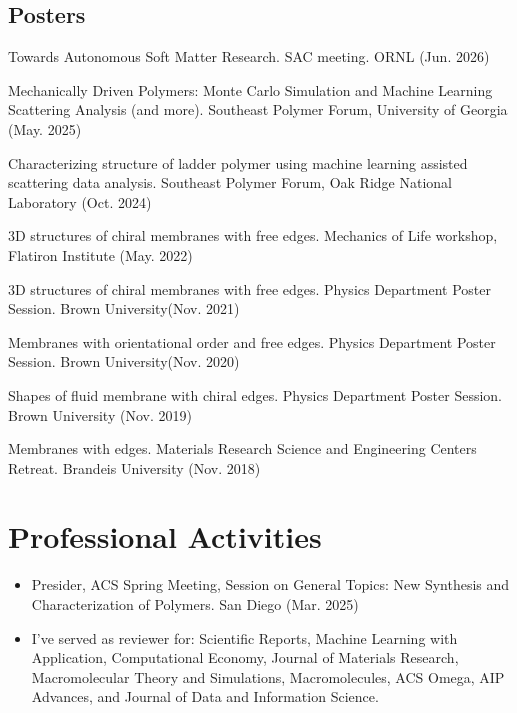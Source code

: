 \documentclass[11pt,letterpaper]{article}
\begin{document}
\subsection*{Posters}
\begin{etaremune}
    \item Towards Autonomous Soft Matter Research. SAC meeting. ORNL (Jun. 2026)
    \item Mechanically Driven Polymers: Monte Carlo Simulation and Machine Learning Scattering Analysis (and more). Southeast Polymer Forum, University of Georgia  (May. 2025)
    \item Characterizing structure of ladder polymer using machine learning assisted scattering data analysis. Southeast Polymer Forum, Oak Ridge National Laboratory (Oct. 2024)
    \item 3D structures of chiral membranes with free edges. Mechanics of Life workshop, Flatiron Institute (May. 2022)
    \item 3D structures of chiral membranes with free edges. Physics Department Poster Session. Brown University(Nov. 2021)
    \item Membranes with orientational order and free edges. Physics Department Poster Session. Brown University(Nov. 2020)
    \item Shapes of fluid membrane with chiral edges. Physics Department Poster Session. Brown University (Nov. 2019)
    \item Membranes with edges. Materials Research Science and Engineering Centers Retreat. Brandeis University (Nov. 2018)
\end{etaremune}



\section*{Professional Activities}
\vspace*{-0.15in}
\begin{itemize}
    \item Presider, ACS Spring Meeting, Session on General Topics: New Synthesis and Characterization of Polymers. San Diego (Mar. 2025)
    \item I've served as reviewer for: Scientific Reports, Machine Learning with Application, Computational Economy, Journal of Materials Research, Macromolecular Theory and Simulations, Macromolecules, ACS Omega, AIP Advances, and Journal of Data and Information Science.
\end{itemize}
\end{document}
